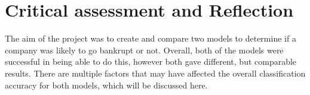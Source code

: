 \documentclass[11pt]{article}
\begin{document}

% 
 


\newpage
\section{Critical assessment and Reflection }
The aim of the project was to create and compare two models to determine if a company was likely to go bankrupt or not. Overall, both of the models were successful in being able to do this, however both gave different, but comparable results. 
There are multiple factors that may have affected the overall classification accuracy for both models, which will be discussed here. \\
\end{document}
